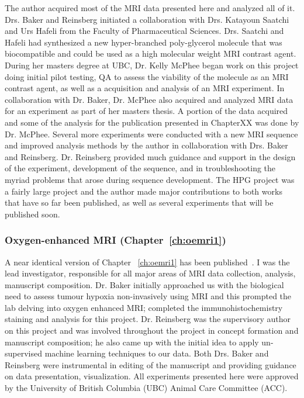 The author acquired most of the MRI data presented here and analyzed all of it.
Drs. Baker and Reinsberg initiated a collaboration with Drs. Katayoun Saatchi and Urs Hafeli from the Faculty of Pharmaceutical Sciences.
Drs. Saatchi and Hafeli had synthesized a new hyper-branched poly-glycerol molecule that was biocompatible and could be used as a high molecular weight MRI contrast agent.
During her masters degree at UBC, Dr. Kelly McPhee began work on this project doing initial pilot testing, QA to assess the viability of the molecule as an MRI contrast agent, as well as a acquisition and analysis of an MRI experiment.
In collaboration with Dr. Baker, Dr. McPhee also acquired and analyzed MRI data for an experiment as part of her masters thesis. 
A portion of the data acquired and some of the analysis for the publication presented in ChapterXX was done by Dr. McPhee.
Several more experiments were conducted with a new MRI sequence and improved analysis methods by the author in collaboration with Drs. Baker and Reinsberg. 
Dr.  Reinsberg provided much guidance and support in the design of the experiment, development of the sequence, and in troubleshooting the myriad problems that arose during sequence development.
The HPG project was a fairly large project and the author made major contributions to both works that have so far been published, as well as several experiments that will be published soon.

\subsubsection{Oxygen-enhanced MRI (Chapter~\ref{ch:oemri1})}

A near identical version of Chapter ~\ref{ch:oemri1} has been published~\cite{Moosvi:2018ca}. 
I was the lead investigator, responsible for all major areas of MRI data collection, analysis, manuscript composition. 
Dr. Baker initially approached us with the biological need to assess tumour hypoxia non-invasively using MRI and this prompted the lab delving into oxygen enhanced MRI; completed the immunohistochemistry staining and analysis for this project.
Dr. Reinsberg was the supervisory author on this project and was involved throughout the project in concept formation and manuscript composition; he also came up with the initial idea to apply un-supervised machine learning techniques to our data. 
Both Drs. Baker and Reinsberg were instrumental in editing of the manuscript and providing guidance on data presentation, visualization.
All experiments presented here were approved by the University of British Columbia (UBC) Animal Care Committee (ACC).

